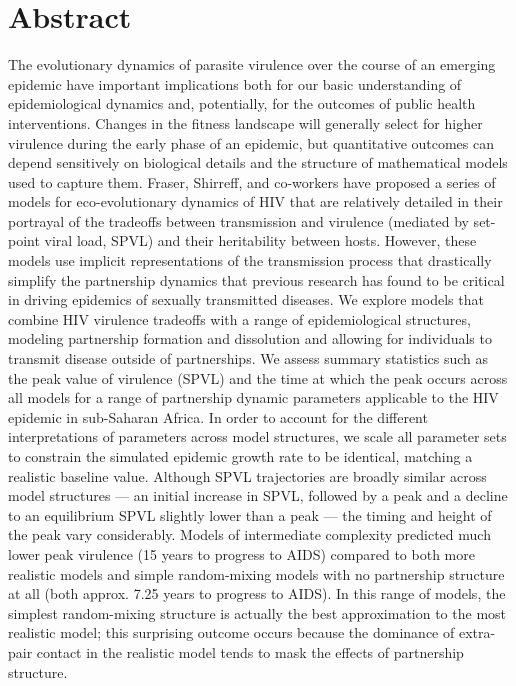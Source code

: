 \documentclass[10pt,letterpaper]{article}
\begin{document}
\section*{Abstract}
The evolutionary dynamics of parasite virulence over the
  course of an emerging epidemic have important implications both for
  our basic understanding of epidemiological dynamics and,
  potentially, for the outcomes of public health interventions.
  Changes in the fitness landscape
  will generally select for higher virulence during the early
  phase of an epidemic, but quantitative outcomes
  can depend sensitively on biological details and the structure of
  mathematical models used to capture them.  Fraser, Shirreff, and
  co-workers have proposed a series of models for eco-evolutionary
  dynamics of HIV that are relatively detailed in their portrayal of
  the tradeoffs between transmission and virulence (mediated by
  set-point viral load, SPVL) and their heritability between
  hosts. However, these models use implicit
  representations of the transmission process that drastically simplify the
  partnership dynamics that previous research has found to be critical
  in driving epidemics of sexually transmitted diseases.  We
  explore models that combine HIV virulence tradeoffs with a range of
  epidemiological structures, modeling partnership formation and
  dissolution and allowing for individuals to transmit disease outside
  of partnerships. We assess summary statistics such as the peak value
  of virulence (SPVL) and the time at which the peak occurs across all
  models for a range of 
  partnership dynamic parameters 
  applicable to the HIV epidemic in sub-Saharan Africa. In
  order to account for the different interpretations of parameters
  across model structures, we scale all parameter sets to constrain
  the simulated epidemic growth rate to be identical, matching a
  realistic baseline value. 
  Although SPVL trajectories are broadly similar
  across model structures --- an initial increase in SPVL, 
  followed by a peak and a decline to an equilibrium SPVL slightly
  lower than a peak --- the timing and height of the peak vary
  considerably.
  Models of intermediate
  complexity predicted much lower peak virulence (15 years to
  progress to AIDS) compared to both more realistic models
  and simple random-mixing models with no partnership structure
  at all (both approx. 7.25 years to progress to AIDS).
  In this range of models, the simplest random-mixing structure is
  actually the best approximation to the most realistic model; this
  surprising outcome occurs because the dominance of extra-pair
  contact in the realistic model tends to mask the effects of
  partnership structure.
\end{document}
